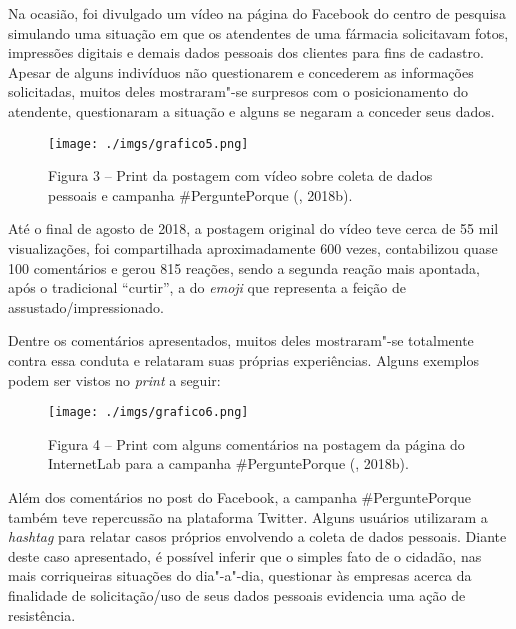 Na ocasião, foi divulgado um vídeo na página do Facebook do centro de
pesquisa simulando uma situação em que os atendentes de uma fármacia
solicitavam fotos, impressões digitais e demais dados pessoais dos
clientes para fins de cadastro. Apesar de alguns indivíduos não
questionarem e concederem as informações solicitadas, muitos deles
mostraram"-se surpresos com o posicionamento do atendente, questionaram a
situação e alguns se negaram a conceder seus dados.

\begin{figure}[!ht]
\centering
  \texttt{[image: ./imgs/grafico5.png]}
\caption{Figura 3 -- Print da postagem com vídeo sobre coleta de dados pessoais e campanha \#PerguntePorque (, 2018b).}
 \end{figure}

Até o final de agosto de 2018, a postagem original do vídeo teve cerca
de 55 mil visualizações, foi compartilhada aproximadamente 600 vezes,
contabilizou quase 100 comentários e gerou 815 reações, sendo a segunda
reação mais apontada, após o tradicional ``curtir'', a do \emph{emoji}
que representa a feição de assustado/impressionado.

Dentre os comentários apresentados, muitos deles mostraram"-se totalmente
contra essa conduta e relataram suas próprias experiências. Alguns
exemplos podem ser vistos no \emph{print} a seguir:

\begin{figure}[!ht]
\centering
  \texttt{[image: ./imgs/grafico6.png]}
\caption{Figura 4 -- Print com alguns comentários na postagem da página do InternetLab para a campanha \#PerguntePorque (, 2018b).}
 \end{figure}

Além dos comentários no post do Facebook, a campanha \#PerguntePorque
também teve repercussão na plataforma Twitter. Alguns usuários
utilizaram a \emph{hashtag} para relatar casos próprios envolvendo a
coleta de dados pessoais. Diante deste caso apresentado, é possível
inferir que o simples fato de o cidadão, nas mais corriqueiras situações
do dia"-a"-dia, questionar às empresas acerca da finalidade de
solicitação/uso de seus dados pessoais evidencia uma ação de
resistência.

